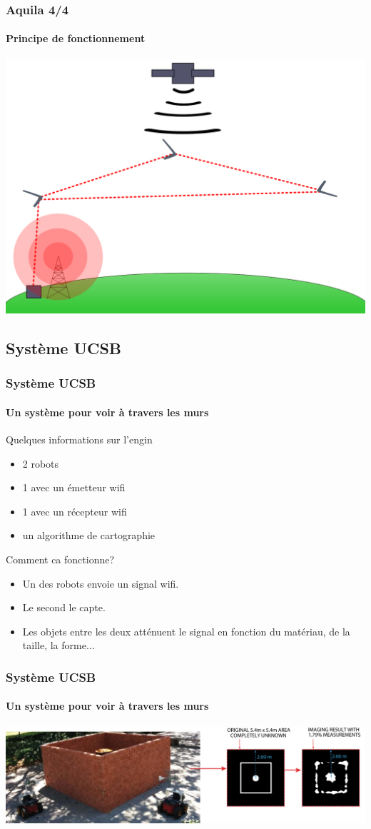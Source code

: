 \documentclass{beamer}
\begin{document}
\begin{frame}
  \frametitle{Aquila 4/4}
  \framesubtitle{Principe de fonctionnement}
  \includegraphics[width=\textwidth]{../Images/schema_aquila.png}
\end{frame}

\subsection{Système UCSB}
\begin{frame}
  \frametitle{Système UCSB}
  \framesubtitle{Un système pour voir à travers les murs}
  \begin{block}{Quelques informations sur l'engin}
    \begin{itemize}
      \item 2 robots
      \item 1 avec un émetteur wifi
      \item 1 avec un récepteur wifi
      \item un algorithme de cartographie
    \end{itemize}
  \end{block}
    \begin{block}{Comment ca fonctionne?}
    \begin{itemize}
    \item Un des robots envoie un signal wifi.
    \item Le second le capte.
    \item Les objets entre les deux atténuent le signal en fonction du matériau, de la taille, la forme...
    \end{itemize}
  \end{block}
\end{frame}

\begin{frame}
  \frametitle{Système UCSB}
  \framesubtitle{Un système pour voir à travers les murs}
  \includegraphics[width=\textwidth]{../Images/UCSB1.jpg}
\end{frame}
 
\end{document}
